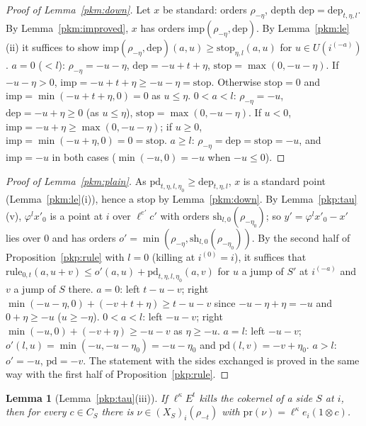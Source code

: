 \documentclass[10pt]{amsart}
\newtheorem{lemma}[theorem]{Lemma}
\theoremstyle{definition}
\theoremstyle{remark}
\begin{document}
\begin{proof}[Proof of Lemma~\ref{pkm:down}]
Let $x$ be standard: orders $\rho_{-\eta}$, depth $\mathrm{dep}=\mathrm{dep}_{t,\eta,l}$. By
Lemma~\ref{pkm:improved}, $x$ has orders $\mathrm{imp}(\rho_{-\eta},\mathrm{dep})$. By
Lemma~\ref{pkm:le}(ii) it suffices to show $\mathrm{imp}(\rho_{-\eta},\mathrm{dep})(a,u)\ge
\mathrm{stop}_{\eta,l}(a,u)$ for $u\in U(i^{(-a)})$. \emph{$a=0$} ($<l$): $\rho_{-\eta}=-u-\eta$,
$\mathrm{dep}=-u+t+\eta$, $\mathrm{stop}=\max(0,-u-\eta)$. If $-u-\eta>0$, $\mathrm{imp}=-u+t+\eta\ge-u-\eta=
\mathrm{stop}$. Otherwise $\mathrm{stop}=0$ and $\mathrm{imp}=\min(-u+t+\eta,0)=0$ as $u\le\eta$.
\emph{$0<a<l$}: $\rho_{-\eta}=-u$, $\mathrm{dep}=-u+\eta\ge0$ (as $u\le\eta$), $\mathrm{stop}=
\max(0,-u-\eta)$. If $u<0$, $\mathrm{imp}=-u+\eta\ge\max(0,-u-\eta)$; if $u\ge0$, $\mathrm{imp}=
\min(-u+\eta,0)=0=\mathrm{stop}$. \emph{$a\ge l$}: $\rho_{-\eta}=\mathrm{dep}=\mathrm{stop}=-u$, and
$\mathrm{imp}=-u$ in both cases ($\min(-u,0)=-u$ when $-u\le0$).
\end{proof}

\begin{proof}[Proof of Lemma~\ref{pkm:plain}]
As $\mathrm{pd}_{t,\eta,l,\eta_0}\ge\mathrm{dep}_{t,\eta,l}$, $x$ is a standard point (Lemma~\ref{pkm:le}(i)),
hence a stop by Lemma~\ref{pkm:down}. By Lemma~\ref{pkp:tau}(v), $\varphi^lx'_0$ is a point at $i$ over
$\ell^{e'}c'$ with orders $\mathrm{sh}_{l,0}(\rho_{-\eta_0})$; so $y'=\varphi^lx'_0-x'$ lies over $0$
and has orders $o'=\min(\rho_{-\eta},\mathrm{sh}_{l,0}(\rho_{-\eta_0}))$. By the second half of
Proposition~\ref{pkp:rule} with $l=0$ (killing at $i^{(0)}=i$), it suffices that
$\mathrm{rule}_{0,t}(a,u+v)\le o'(a,u)+\mathrm{pd}_{t,\eta,l,\eta_0}(a,v)$ for $u$ a jump of $S'$ at
$i^{(-a)}$ and $v$ a jump of $S$ there. \emph{$a=0$}: left $t-u-v$; right
$\min(-u-\eta,0)+(-v+t+\eta)\ge t-u-v$ since $-u-\eta+\eta=-u$ and $0+\eta\ge-u$ ($u\ge-\eta$).
\emph{$0<a<l$}: left $-u-v$; right $\min(-u,0)+(-v+\eta)\ge-u-v$ as $\eta\ge-u$. \emph{$a=l$}: left
$-u-v$; $o'(l,u)=\min(-u,-u-\eta_0)=-u-\eta_0$ and $\mathrm{pd}(l,v)=-v+\eta_0$. \emph{$a>l$}: $o'=-u$,
$\mathrm{pd}=-v$. The statement with the sides exchanged is proved in the same way with the first
half of Proposition~\ref{pkp:rule}.
\end{proof}

\begin{lemma}[Lemma~\ref{pkp:tau}(iii)]\label{pkm:tau-iii}
If $\ell^\kappa E^t$ kills the cokernel of a side $S$ at $i$, then for every $c\in C_S$ there is
$\nu\in(X_S)_i(\rho_{-t})$ with $\mathrm{pr}(\nu)=\ell^\kappa e_i(1\otimes c)$.
\end{lemma}
\end{document}
